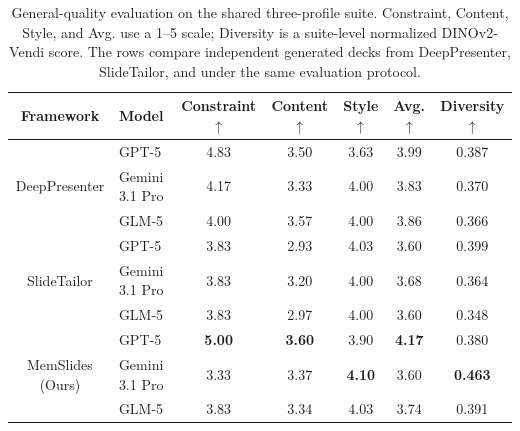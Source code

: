 \begin{table}[t]
\centering
\small
\setlength{\tabcolsep}{5.2pt}
\renewcommand{\arraystretch}{1.0}
\caption{General-quality evaluation on the
shared three-profile suite.  Constraint, Content, Style, and Avg. use a 1--5 scale;
Diversity is a suite-level normalized DINOv2-Vendi score. The rows compare
independent generated decks from DeepPresenter, SlideTailor, and \methodname
under the same evaluation protocol.}
\label{tab:profile_memory_v6_ppteval_main}
\begin{tabular*}{\textwidth}{@{\extracolsep{\fill}}clccccc@{}}
\toprule
Framework & Model & Constraint $\uparrow$ & Content $\uparrow$ & Style $\uparrow$ & Avg. $\uparrow$ & Diversity $\uparrow$ \\
\midrule
\multirow{3}{*}{\centering DeepPresenter}
& GPT-5 & 4.83 & 3.50 & 3.63 & 3.99 & 0.387 \\
& Gemini 3.1 Pro & 4.17 & 3.33 & 4.00 & 3.83 & 0.370 \\
& GLM-5 & 4.00 & 3.57 & 4.00 & 3.86 & 0.366 \\
\midrule
\multirow{3}{*}{\centering SlideTailor}
& GPT-5 & 3.83 & 2.93 & 4.03 & 3.60 & 0.399 \\
& Gemini 3.1 Pro & 3.83 & 3.20 & 4.00 & 3.68 & 0.364 \\
& GLM-5 & 3.83 & 2.97 & 4.00 & 3.60 & 0.348 \\
\midrule
\multirow{3}{*}{\centering MemSlides ({Ours})}
& GPT-5 & \textbf{5.00} & \textbf{3.60} & 3.90 & \textbf{4.17} & 0.380 \\
& Gemini 3.1 Pro & 3.33 & 3.37 & \textbf{4.10} & 3.60 & \textbf{0.463} \\
& GLM-5 & 3.83 & 3.34 & 4.03 & 3.74 & 0.391 \\
\bottomrule
\end{tabular*}
\end{table}
